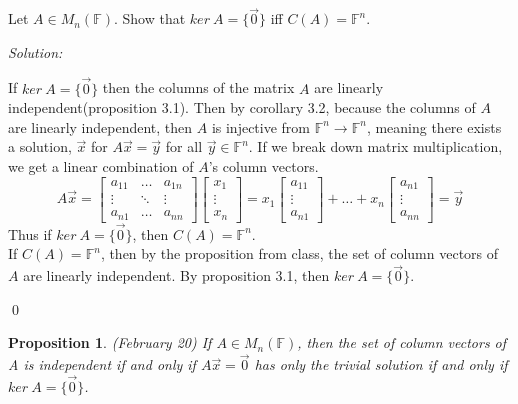 \documentclass[11 pt]{article}
\newenvironment{problem}[2][Problem]{\begin{trivlist}
\item[\hskip \labelsep {\bfseries #1}\hskip \labelsep {\bfseries #2.}]}{\end{trivlist}}
\newenvironment{sol}
    {\emph{Solution:}
    }
    {
    \qed
    }
\newtheorem*{proposition}{Proposition}
\theoremstyle{definition}
\newcommand{\F}{\mathbb{F}} %
\renewcommand{\a}{\alpha}
\begin{document}
\begin{problem}{3.1.10a}
Let $A\in M_n(\F)$. Show that $ker\ A = \{\vec{0}\}$ iff $C(A)=\F^n$.
\end{problem}
\begin{sol}
If $ker\ A=\{\vec{0}\}$ then the columns of the matrix $A$ are linearly independent(proposition 3.1). Then by corollary 3.2, because the columns of $A$ are linearly independent, then $A$ is injective from $\F^n\to\F^n$, meaning there exists a solution, $\vec{x}$ for $A\vec{x}=\vec{y}$ for all $\vec{y}\in \F^n$. If we break down matrix multiplication, we get a linear combination of $A$'s column vectors.
\[A\vec{x}=\begin{bmatrix}
a_{11} & \dots & a_{1n}\\
\vdots & \ddots & \vdots \\
a_{n1} & \dots & a_{nn}
\end{bmatrix}\begin{bmatrix}
x_1\\ \vdots\\ x_n
\end{bmatrix}=x_1\begin{bmatrix}
a_{11}\\\vdots\\a_{n1}
\end{bmatrix}+\dots+x_n\begin{bmatrix}
a_{n1}\\\vdots\\a_{nn}
\end{bmatrix}=\vec{y}\]
Thus if $ker\ A = \{\vec{0}\}$, then $C(A)=\F^{n}$.\\
If $C(A)=\F^n$, then by the proposition from class, the set of column vectors of $A$ are linearly independent. By proposition 3.1, then $ker\ A = \{\vec{0}\}$.
\end{sol}
\begin{proposition}(February 20)
If $A\in M_n(\F)$, then
the set of column vectors of A is independent if and only if $A\vec{x}=\vec{0}$ has only the trivial solution if and only if $ker\ A=\{\vec{0}\}$.
\end{proposition}
\end{document}
